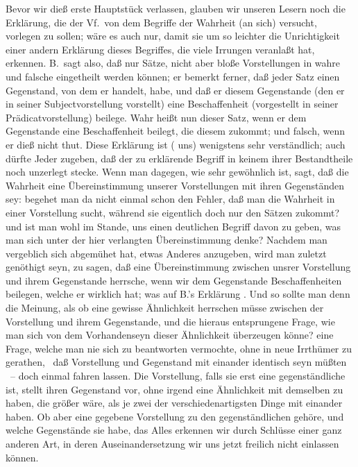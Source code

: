 Bevor wir dieß erste Hauptstück verlassen, glauben wir unseren Lesern noch die Erklärung, die der Vf.\ von dem Begriffe der Wahrheit (an sich) versucht, vorlegen zu sollen; wäre es auch nur, damit sie um so leichter die Unrichtigkeit einer andern Erklärung dieses Begriffes, die viele Irrungen veranlaßt hat, erkennen. B.\ sagt also, daß nur Sätze, nicht aber bloße Vorstellungen in wahre und falsche eingetheilt werden können; er bemerkt ferner, daß jeder Satz einen Gegenstand, von dem er handelt, habe, und daß er diesem Gegenstande (den er in seiner Subjectvorstellung vorstellt) eine Beschaffenheit (vorgestellt in seiner Prädicatvorstellung) beilege. Wahr heißt nun dieser Satz, wenn er dem Gegenstande eine Beschaffenheit beilegt, die diesem zukommt; und falsch, wenn er dieß nicht thut. Diese Erklärung ist ( uns) wenigstens sehr verständlich; auch  dürfte Jeder zugeben, daß der zu erklärende Begriff in keinem ihrer Bestandtheile noch unzerlegt stecke. Wenn man dagegen, wie sehr gewöhnlich ist, sagt, daß die Wahrheit eine Übereinstimmung unserer Vorstellungen mit ihren Gegenständen sey: begehet man da nicht einmal schon den Fehler, daß man die Wahrheit in einer Vorstellung sucht, während sie eigentlich doch nur den Sätzen zukommt? und ist man wohl im Stande, uns einen deutlichen Begriff davon zu geben, was man sich unter der hier verlangten Übereinstimmung denke? Nachdem man vergeblich sich abgemühet hat, etwas Anderes anzugeben, wird man zuletzt genöthigt seyn, zu sagen, daß eine Übereinstimmung zwischen unsrer Vorstellung und ihrem Gegenstande herrsche, wenn wir dem Gegenstande Beschaffenheiten beilegen, welche er wirklich hat; was auf B.'s Erklärung . Und so sollte man denn die Meinung, als ob eine gewisse Ähnlichkeit herrschen müsse zwischen der Vorstellung und ihrem Gegenstande, und die hieraus entsprungene Frage, wie man sich von dem Vorhandenseyn dieser Ähnlichkeit überzeugen könne? eine Frage, welche man nie sich zu beantworten vermochte, ohne in neue Irrthümer zu gerathen, \zB\ daß Vorstellung und Gegenstand mit einander identisch seyn müßten \udgl\ -- doch einmal fahren lassen. Die Vorstellung, falls sie erst eine gegenständliche ist, stellt ihren Gegenstand vor, ohne irgend eine Ähnlichkeit mit demselben zu haben, die größer wäre, als je zwei der verschiedenartigsten Dinge mit einander haben. Ob aber eine gegebene Vorstellung zu den gegenständlichen gehöre, und welche Gegenstände sie habe, das Alles erkennen wir durch Schlüsse einer ganz anderen Art, in deren Auseinandersetzung wir uns jetzt freilich nicht einlassen können. \par
